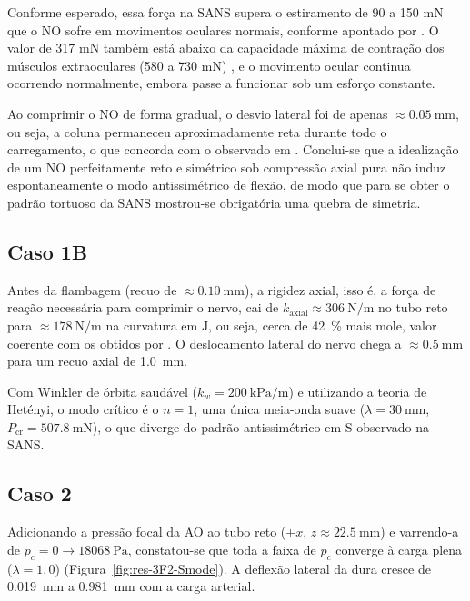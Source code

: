 \documentclass[article, hidelinks,oneside,12pt]{abntex2}
\begin{document}
Conforme esperado, essa força na SANS supera o estiramento de 90 a 150 mN que o NO sofre em movimentos oculares normais, conforme apontado por . O valor de 317 mN também está abaixo da capacidade máxima de contração dos músculos extraoculares (580 a 730 mN) \cite{wang2017}, e o movimento ocular continua ocorrendo normalmente, embora passe a funcionar sob um esforço constante.

Ao comprimir o NO de forma gradual, o desvio lateral foi de apenas $\approx \SI{0.05}{\milli\meter}$, ou seja, a coluna permaneceu aproximadamente reta durante todo o carregamento, o que concorda com o observado em . Conclui-se que a idealização de um NO perfeitamente reto e simétrico sob compressão axial pura não induz espontaneamente o modo antissimétrico de flexão, de modo que para se obter o padrão tortuoso da SANS mostrou-se obrigatória uma quebra de simetria.

\subsection*{Caso 1B}
\label{sec:res-caso1B}

Antes da flambagem (recuo de $\approx \SI{0.10}{\milli\meter}$), a rigidez axial, isso é, a força de reação necessária para comprimir o nervo, cai de $k_{\mathrm{axial}} \approx \SI{306}{\newton\per\meter}$ no tubo reto para $\approx \SI{178}{\newton\per\meter}$ na curvatura em J, ou seja, cerca de \SI{42}{\%} mais mole, valor coerente com os obtidos por . O deslocamento lateral do nervo chega a $\approx \SI{0.5}{\milli\meter}$ para um recuo axial de \SI{1.0}{\milli\meter}.

Com Winkler de órbita saudável ($k_w = \SI{200}{\kilo\pascal\per\meter}$) e utilizando a teoria de Hetényi, o modo crítico é o $n = 1$, uma única meia-onda suave ($\lambda = \SI{30}{\milli\meter}$, $P_{\mathrm{cr}} = \SI{507.8}{\milli\newton}$), o que diverge do padrão antissimétrico em S observado na SANS.


\subsection*{Caso 2}
\label{sec:res-caso2}

Adicionando a pressão focal da AO ao tubo reto ($+x$, $z \approx \SI{22.5}{\milli\meter}$) e varrendo-a de $p_c = 0 \to \SI{18068}{\pascal}$, constatou-se que toda a faixa de $p_c$ converge à carga plena ($\lambda = 1{,}0$) (Figura~\ref{fig:res-3F2-Smode}). A deflexão lateral da dura cresce de \SI{0.019}{\milli\meter} a \SI{0.981}{\milli\meter} com a carga arterial.
\end{document}
